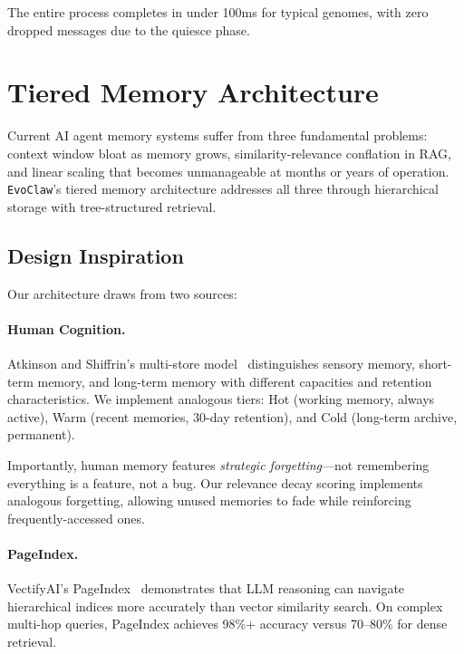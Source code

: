 \documentclass[conference]{IEEEtran}
\newcommand{\evoclaw}{\texttt{EvoClaw}\xspace}
\begin{document}
The entire process completes in under 100ms for typical genomes, with zero dropped messages due to the quiesce phase.





\section{Tiered Memory Architecture}
\label{sec:memory}

Current AI agent memory systems suffer from three fundamental problems: context window bloat as memory grows, similarity-relevance conflation in RAG, and linear scaling that becomes unmanageable at months or years of operation. \evoclaw{}'s tiered memory architecture addresses all three through hierarchical storage with tree-structured retrieval.

\subsection{Design Inspiration}

Our architecture draws from two sources:

\paragraph{Human Cognition.} Atkinson and Shiffrin's multi-store model~\cite{atkinson1971human} distinguishes sensory memory, short-term memory, and long-term memory with different capacities and retention characteristics. We implement analogous tiers: Hot (working memory, always active), Warm (recent memories, 30-day retention), and Cold (long-term archive, permanent).

Importantly, human memory features \textit{strategic forgetting}—not remembering everything is a feature, not a bug. Our relevance decay scoring implements analogous forgetting, allowing unused memories to fade while reinforcing frequently-accessed ones.

\paragraph{PageIndex.} VectifyAI's PageIndex~\cite{vectifyai_pageindex} demonstrates that LLM reasoning can navigate hierarchical indices more accurately than vector similarity search. On complex multi-hop queries, PageIndex achieves 98\%+ accuracy versus 70--80\% for dense retrieval.
\end{document}
